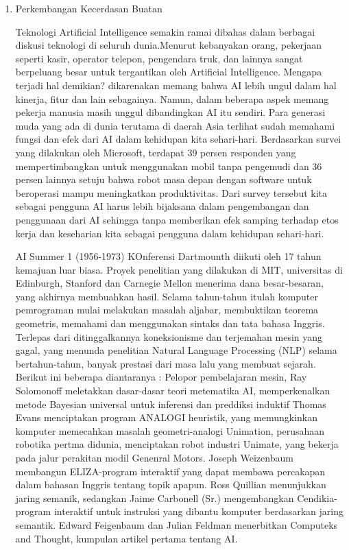 \begin{enumerate}
    \item{Perkembangan Kecerdasan Buatan}
    \par Teknologi Artificial Intelligence semakin ramai dibahas dalam berbagai diskusi teknologi di seluruh dunia.Menurut kebanyakan orang, pekerjaan seperti kasir, operator telepon, pengendara truk, dan lainnya sangat berpeluang besar untuk tergantikan oleh Artificial Intelligence. Mengapa terjadi hal demikian? dikarenakan memang bahwa AI lebih ungul dalam hal kinerja, fitur dan lain sebagainya. Namun, dalam beberapa aspek memang pekerja manusia masih unggul dibandingkan AI itu sendiri. Para generasi muda yang ada di dunia terutama di daerah Asia terlihat sudah memahami fungsi dan efek dari AI dalam kehidupan kita sehari-hari. Berdasarkan survei yang dilakukan oleh Microsoft, terdapat 39 persen responden yang mempertimbangkan untuk menggunakan mobil tanpa pengemudi dan 36 persen lainnya setuju bahwa robot masa depan dengan software untuk beroperasi mampu meningkatkan produktivitas. Dari survey tersebut kita sebagai pengguna AI harus lebih bijaksana dalam pengembangan dan penggunaan dari AI sehingga tanpa memberikan efek samping terhadap etos kerja dan keseharian kita sebagai pengguna dalam kehidupan sehari-hari.

    AI Summer 1 (1956-1973) KOnferensi Dartmounth diikuti oleh 17 tahun kemajuan luar biasa. Proyek penelitian yang dilakukan di MIT, universitas di Edinburgh, Stanford dan Carnegie Mellon menerima dana besar-besaran, yang akhirnya membuahkan hasil. Selama tahun-tahun itulah komputer pemrograman mulai melakukan masalah aljabar, membuktikan teorema geometris, memahami dan menggunakan sintaks dan tata bahasa Inggris. Terlepas dari ditinggalkannya koneksionisme dan terjemahan mesin yang gagal, yang menunda penelitian Natural Language Processing (NLP) selama bertahun-tahun, banyak prestasi dari masa lalu yang membuat sejarah. Berikut ini beberapa diantaranya : Pelopor pembelajaran mesin, Ray Solomonoff meletakkan dasar-dasar teori metematika AI, memperkenalkan metode Bayesian universal untuk inferensi dan preddiksi induktif Thomas Evans menciptakan program ANALOGI heuristik, yang memungkinkan komputer memecahkan masalah geometri-analogi Unimation, perusahaan robotika pertma didunia, menciptakan robot industri Unimate, yang bekerja pada jalur perakitan modil Genenral Motors. Joseph Weizenbaum membangun ELIZA-program interaktif yang dapat membawa percakapan dalam bahasan Inggris tentang topik apapun. Ross Quillian menunjukkan jaring semanik, sedangkan Jaime Carbonell (Sr.) mengembangkan Cendikia-program interaktif untuk instruksi yang dibantu komputer berdasarkan jaring semantik. Edward Feigenbaum dan Julian Feldman menerbitkan Computeks and Thought, kumpulan artikel pertama tentang AI.


\end{enumerate}
